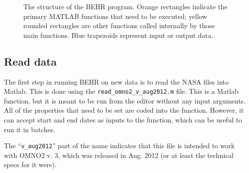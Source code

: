 \documentclass[12pt]{article}
\begin{document}
\begin{figure}
	\caption{The structure of the BEHR program. Orange rectangles indicate the primary MATLAB functions that need to be executed; yellow rounded rectangles are other functions called internally by those main functions. Blue trapezoids represent input or output data.}
	\label{fig:curr-pgrm-flow}
	\end{figure}

	\subsection{Read data}
	
	The first step in running BEHR on new data is to read the NASA files into Matlab.  This is done using the \texttt{read\_omno2\_v\_aug2012.m} file.  This is a Matlab function, but it is meant to be run from the editor without any input arguments. All of the properties that need to be set are coded into the function.  However, it can accept start and end dates as inputs to the function, which can be useful to run it in batches.
	
	 The ``\texttt{v\_aug2012}'' part of the name indicates that this file is intended to work with OMNO2 v. 3, which was released in Aug. 2012 (or at least the technical specs for it were).  
	 
\end{document}
